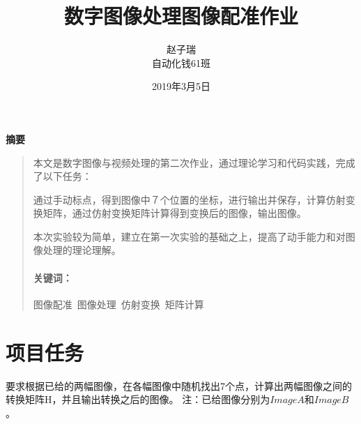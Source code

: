 \documentclass[UTF8]{ctexart}
\title{数字图像处理图像配准作业}
\author{赵子瑞 \\ 自动化钱61班}
\date{2019年3月5日}
\newcommand{\xiaosi}{\fontsize{11.6pt}{\baselineskip}\selectfont}
\newcommand{\sihao}{\fontsize{12.1pt}{\baselineskip}\selectfont}
\begin{document}
\maketitle

\newenvironment{cnabandkey}[2][\sihao 摘要] %
{\newcommand{\ckeywords}{#2} %
	\begin{center} \bfseries #1 \end{center} %
	\begin{quotation}
	}{\paragraph{\sihao 关键词：} \textrm{\ckeywords} %
	\end{quotation}
}

\newenvironment{enabandkey}[2][\sihao Abstract] %
{\newcommand{\ekeywords}{#2} %
	\begin{center} \bfseries #1 \end{center} %
	\begin{quotation}
	}{\paragraph{\sihao Keywords：} \textrm{\ekeywords} %
	\end{quotation}
}

	\begin{cnabandkey}{图像配准\, 图像处理\, 仿射变换\, 矩阵计算}
        \xiaosi
        \hspace{0.25em}本文是数字图像与视频处理的第二次作业，通过理论学习和代码实践，完成了以下任务：
        
		通过手动标点，得到图像中７个位置的坐标，进行输出并保存，计算仿射变换矩阵，通过仿射变换矩阵计算得到变换后的图像，输出图像。
		
		本次实验较为简单，建立在第一次实验的基础之上，提高了动手能力和对图像处理的理论理解。
		
	\end{cnabandkey}
	
	\clearpage



\xiaosi
\section{项目任务}

要求根据已给的两幅图像，在各幅图像中随机找出7个点，计算出两幅图像之间的转换矩阵H，并且输出转换之后的图像。
注：已给图像分别为$Image A$和$Image B$。
\end{document}
